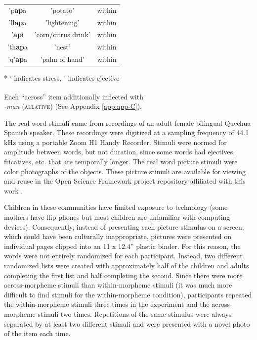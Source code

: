 \documentclass[a4paper,man,floatsintext,natbib,donotrepeattitle, apacite]{apa6}
\begin{document}
\begin{table}
\begin{tabular}{c | c| c}
\hline

\footnotesize{\textsf{'}p\textbf{ap}a} & 'potato' & within \\
\footnotesize{\textsf{'}ll\textbf{ap}a} & 'lightening' & within \\
\footnotesize{\textsf{'}\textbf{ap}i} & 'corn/citrus drink' & within \\
\footnotesize{\textsf{'}th\textbf{ap}a} & 'nest' & within \\
\footnotesize{\textsf{'}q'\textbf{ap}a} & 'palm of hand' & within \\

 \hline
\end{tabular}\par
\smallskip
* ' indicates stress, \textsf{'} indicates ejective\par
\smallskip
\textsuperscript{\textdagger} Each ``across'' item additionally inflected with \\ \textit{-man} (\textsc{allative}) (See Appendix \ref{app:app-C}).
\end{table}


The real word stimuli came from recordings of an adult female bilingual Quechua-Spanish speaker. These recordings were digitized at a sampling frequency of 44.1 kHz using a portable Zoom H1 Handy Recorder. Stimuli were normed for amplitude between words, but not duration, since some words had ejectives, fricatives, etc. that are temporally longer. The real word picture stimuli were color photographs of the objects. These picture stimuli are available for viewing and reuse in the Open Science Framework project repository affiliated with this work \citep{cychoszWordStructureEarly2020}.  

Children in these communities have limited exposure to technology (some mothers have flip phones but most children are unfamiliar with computing devices). Consequently, instead of presenting each picture stimulus on a screen, which could have been culturally inappropriate, pictures were presented on individual pages clipped into an 11 x 12.4'' plastic binder. For this reason, the words were not entirely randomized for each participant. Instead, two different randomized lists were created with approximately half of the children and adults completing the first list and half completing the second. Since there were more across-morpheme stimuli than within-morpheme stimuli (it was much more difficult to find stimuli for the within-morpheme condition), participants repeated the within-morpheme stimuli three times in the experiment and the across-morpheme stimuli two times. Repetitions of the same stimulus were always separated by at least two different stimuli and were presented with a novel photo of the item each time.   
\end{document}
